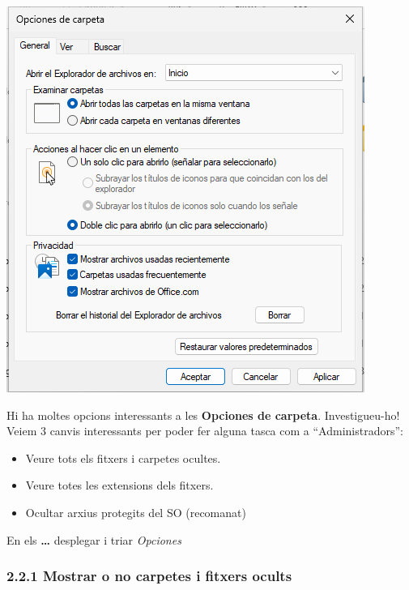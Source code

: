 \documentclass[
  a4paper,
]{article}
\providecommand{\tightlist}{%
  \setlength{\itemsep}{0pt}\setlength{\parskip}{0pt}}
\begin{document}
\includegraphics{png/veropcionesCarpeta0.png}

Hi ha moltes opcions interessants a les \textbf{Opciones de carpeta}.
Investigueu-ho! Veiem 3 canvis interessants per poder fer alguna tasca
com a ``Administradors'':

\begin{itemize}
\tightlist
\item
  Veure tots els fitxers i carpetes ocultes.
\item
  Veure totes les extensions dels fitxers.
\item
  Ocultar arxius protegits del SO (recomanat)
\end{itemize}

En els \textbf{\ldots{}} desplegar i triar \emph{Opciones}

\subsubsection{2.2.1 Mostrar o no carpetes i fitxers
ocults}\label{mostrar-o-no-carpetes-i-fitxers-ocults}
\end{document}
